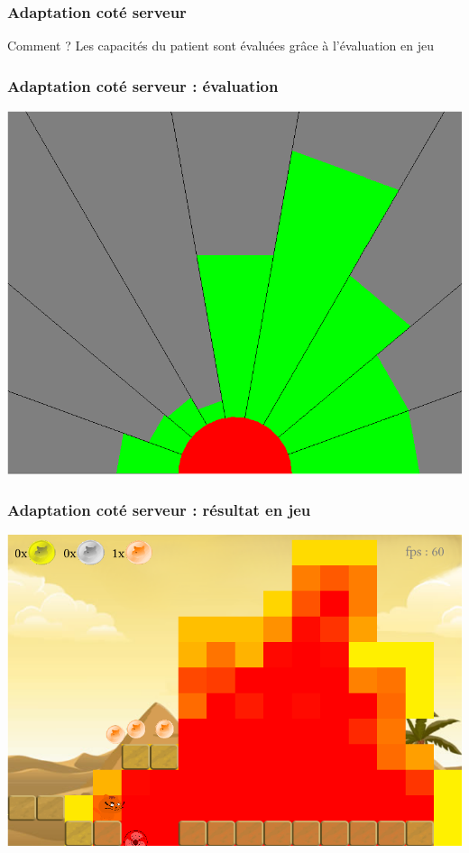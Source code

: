 \documentclass{beamer}
\begin{document}
\begin{frame}
\frametitle{Adaptation coté serveur}

\begin{block}{Comment ?}
Les capacités du patient sont évaluées grâce à l'évaluation en jeu
\end{block}

\end{frame}

\begin{frame}
\frametitle{Adaptation coté serveur : évaluation}

\centering \includegraphics[scale=0.3]{images/assessment.png}

\end{frame}

\begin{frame}
\frametitle{Adaptation coté serveur : résultat en jeu}

\centering \includegraphics[scale=0.3]{images/abilityzone.png}

\end{frame}
\end{document}
